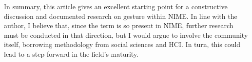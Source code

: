 In summary, this article gives an excellent starting point for a constructive discussion and documented research on gesture within NIME. In line with the author, I believe that, since the term is so present in NIME, further research must be conducted in that direction, but I would argue to involve the community itself, borrowing methodology from social sciences and HCI. In turn, this could lead to a step forward in the field's maturity.


%
